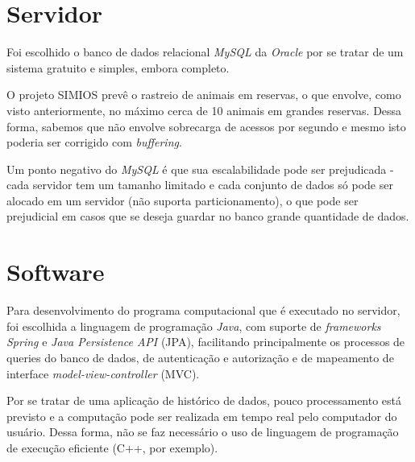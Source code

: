 \section{Servidor}
Foi escolhido o banco de dados relacional \emph{MySQL} da \emph{Oracle} por se tratar de um sistema gratuito e simples, embora completo.

O projeto SIMIOS prevê o rastreio de animais em reservas, o que envolve, como visto anteriormente, no máximo cerca de 10 animais em grandes reservas. Dessa forma, sabemos que não envolve sobrecarga de acessos por segundo e mesmo isto poderia ser corrigido com \emph{buffering}.

Um ponto negativo do \emph{MySQL} é que sua escalabilidade pode ser prejudicada - cada servidor tem um tamanho limitado e cada conjunto de dados só pode ser alocado em um servidor (não suporta particionamento), o que pode ser prejudicial em casos que se deseja guardar no banco grande quantidade de dados.

\section{Software}
Para desenvolvimento do programa computacional que é executado no servidor, foi escolhida a linguagem de programação \emph{Java}, com suporte de \emph{frameworks} \emph{Spring} e \emph{Java Persistence API} (JPA), facilitando principalmente os processos de queries do banco de dados, de autenticação e autorização e de mapeamento de interface \emph{model-view-controller} (MVC).

Por se tratar de uma aplicação de histórico de dados, pouco processamento está previsto e a computação pode ser realizada em tempo real pelo computador do usuário. Dessa forma, não se faz necessário o uso de linguagem de programação de execução eficiente (C++, por exemplo).
